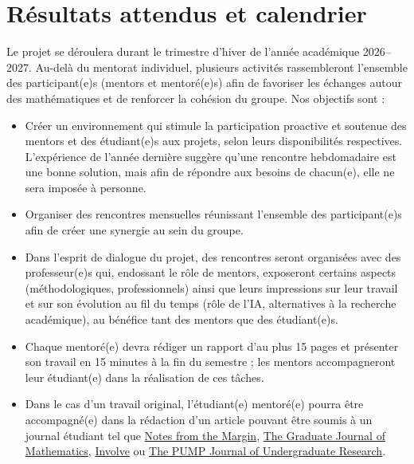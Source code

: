 \section{Résultats attendus et calendrier}

Le projet se déroulera durant le trimestre d'hiver de l'année académique 2026--2027. Au-del\`a du mentorat individuel, plusieurs activités rassembleront l'ensemble des participant(e)s (mentors et mentoré(e)s) afin de favoriser les échanges autour des mathématiques et de renforcer la cohésion du groupe. Nos objectifs sont :

\begin{itemize}[leftmargin=1.6em,labelsep=0.6em]

    \item[\ding{118}] Créer un environnement qui stimule la participation proactive et soutenue des mentors et des étudiant(e)s aux projets, selon leurs disponibilités respectives. L'expérience de l'année dernière suggère qu'une rencontre hebdomadaire est une bonne solution, mais afin de répondre aux besoins de chacun(e), elle ne sera imposée à personne.

    \item[\ding{118}] Organiser des rencontres mensuelles réunissant l'ensemble des participant(e)s afin de créer une synergie au sein du groupe.

    \item[\ding{118}] Dans l'esprit de dialogue du projet, des rencontres seront organisées avec des professeur(e)s qui, endossant le rôle de mentors, exposeront certains aspects (méthodologiques, professionnels) ainsi que leurs impressions sur leur travail et sur son évolution au fil du temps (rôle de l'IA, alternatives à la recherche académique), au bénéfice tant des mentors que des étudiant(e)s.

    \item[\ding{118}] Chaque mentoré(e) devra rédiger un rapport d'au plus 15 pages et présenter son travail en 15 minutes à la fin du semestre ; les mentors accompagneront leur étudiant(e) dans la réalisation de ces tâches. %

    \item[\ding{118}] Dans le cas d'un travail original, l'étudiant(e) mentoré(e) pourra \^{e}tre accompagné(e) dans la rédaction d'un article pouvant être soumis \`a un journal étudiant tel que \href{https://studc.math.ca/notes-from-the-margin/}{Notes from the Margin}, \href{https://gradmath.org/}{The Graduate Journal of Mathematics}, \href{https://msp.org/involve/about/journal/about.html}{Involve} ou \href{https://journals.calstate.edu/pump/about}{The PUMP Journal of Undergraduate Research}.


\end{itemize}

